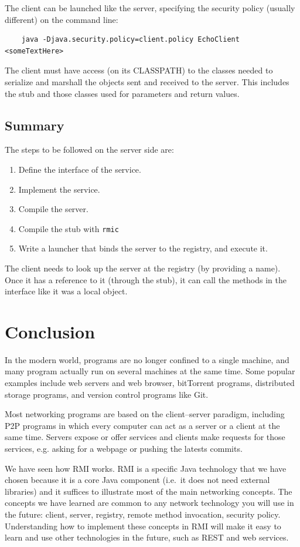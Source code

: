 The client can be launched like the server, specifying the security
policy (usually different) on the command line: 

\begin{verbatim}
    java -Djava.security.policy=client.policy EchoClient <someTextHere>
\end{verbatim}

The client must have access (on its CLASSPATH) to the classes needed
to serialize and marshall the objects sent and received to the
server. This includes the stub and those classes used for parameters
and return values. 

\subsection{Summary}
\label{sec:summary}

The steps to be followed on the server side are: 

\begin{enumerate}
\item Define the interface of the service.
\item Implement the service.
\item Compile the server.
\item Compile the stub with \verb+rmic+
\item Write a launcher that binds the server to the registry, and
  execute it. 
\end{enumerate}

The client needs to look up the server at the registry (by providing a
name). Once it has a reference to it (through the stub), it can call
the methods in the interface like it was a local object. 

\section{Conclusion}
\label{sec:conclusion}

In the modern world, programs are no longer confined to a single
machine, and many program actually run on several machines at the same
time. Some popular examples include web servers and web browser,
bitTorrent programs, distributed storage programs, and version control
programs like Git. 

Most networking programs are based on the client--server paradigm,
including P2P programs in which every computer can act as a server or
a client at the same time. Servers expose or offer services and
clients make requests for those services, e.g. asking for a webpage or
pushing the latests commits. 

We have seen how RMI works. RMI is a specific Java technology that we
have chosen because it is a core Java component (i.e.~it does not need
external libraries) and it suffices to illustrate most of the main
networking concepts. The concepts we have learned are common to any
network technology you will use in the future: client, server,
registry, remote method invocation, security policy. Understanding how
to implement these concepts in RMI will make it easy to learn and use
other technologies in the future, such as REST and web services.



